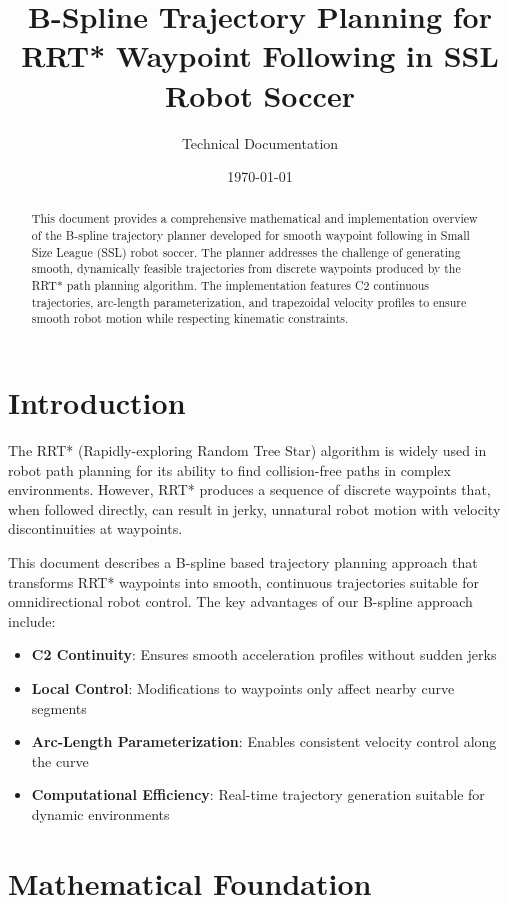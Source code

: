\documentclass[11pt]{article}
\title{B-Spline Trajectory Planning for RRT* Waypoint Following in SSL Robot Soccer}
\author{Technical Documentation}
\date{\today}
\begin{document}
\maketitle

\begin{abstract}
This document provides a comprehensive mathematical and implementation overview of the B-spline trajectory planner developed for smooth waypoint following in Small Size League (SSL) robot soccer. The planner addresses the challenge of generating smooth, dynamically feasible trajectories from discrete waypoints produced by the RRT* path planning algorithm. The implementation features C2 continuous trajectories, arc-length parameterization, and trapezoidal velocity profiles to ensure smooth robot motion while respecting kinematic constraints.
\end{abstract}

\tableofcontents
\newpage

\section{Introduction}

The RRT* (Rapidly-exploring Random Tree Star) algorithm is widely used in robot path planning for its ability to find collision-free paths in complex environments. However, RRT* produces a sequence of discrete waypoints that, when followed directly, can result in jerky, unnatural robot motion with velocity discontinuities at waypoints.

This document describes a B-spline based trajectory planning approach that transforms RRT* waypoints into smooth, continuous trajectories suitable for omnidirectional robot control. The key advantages of our B-spline approach include:

\begin{itemize}
    \item \textbf{C2 Continuity}: Ensures smooth acceleration profiles without sudden jerks
    \item \textbf{Local Control}: Modifications to waypoints only affect nearby curve segments
    \item \textbf{Arc-Length Parameterization}: Enables consistent velocity control along the curve
    \item \textbf{Computational Efficiency}: Real-time trajectory generation suitable for dynamic environments
\end{itemize}

\section{Mathematical Foundation}
\end{document}

